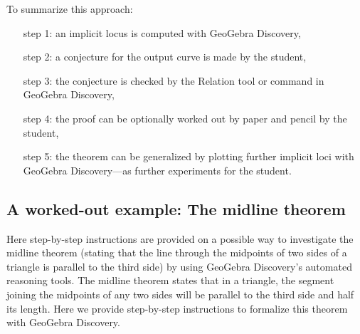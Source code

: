 \documentclass{article}
\begin{document}
To summarize this approach:
\begin{enumerate}
    \item[step 1:] an implicit locus is computed with GeoGebra Discovery,
    \item[step 2:] a conjecture for the output curve is made by the student,
    \item[step 3:] the conjecture is checked by the Relation tool or command in GeoGebra Discovery,
    \item[step 4:] the proof can be optionally worked out by paper and pencil by the student,
    \item[step 5:] the theorem can be generalized by plotting further implicit loci with GeoGebra Discovery---as further experiments for the student.
\end{enumerate}

\subsection{A worked-out example: The midline theorem}

Here step-by-step instructions are provided on a possible way to investigate the midline theorem  (stating that the line through the midpoints of two sides of a triangle is parallel to the third side) by using GeoGebra Discovery's automated reasoning tools.
The midline theorem states that in a triangle,
the segment joining the midpoints of any two sides will be parallel to the third side and half its length.
Here we provide step-by-step instructions to formalize this theorem with GeoGebra Discovery.
\end{document}

